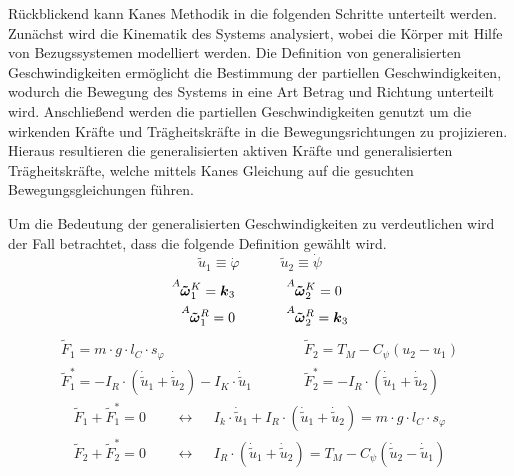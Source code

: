 Rückblickend kann Kanes Methodik in die folgenden Schritte unterteilt werden. Zunächst wird die Kinematik des Systems analysiert, wobei die Körper mit Hilfe von Bezugssystemen modelliert werden. Die Definition von generalisierten Geschwindigkeiten ermöglicht die Bestimmung der partiellen Geschwindigkeiten, wodurch die Bewegung des Systems in eine Art Betrag und Richtung unterteilt wird. Anschließend werden die partiellen Geschwindigkeiten genutzt um die wirkenden Kräfte und Trägheitskräfte in die Bewegungsrichtungen zu projizieren. Hieraus resultieren die generalisierten aktiven Kräfte und generalisierten Trägheitskräfte, welche mittels Kanes Gleichung auf die gesuchten Bewegungsgleichungen führen.

Um die Bedeutung der generalisierten Geschwindigkeiten zu verdeutlichen wird der Fall betrachtet, dass die folgende Definition gewählt wird.
\begin{equation}
\tilde{u}_1 \equiv \dot{\varphi} \hspace{35pt} \tilde{u}_2 \equiv \dot{\psi}
\end{equation}
\begin{equation}
\begin{split}
\vel{A}{\tilde{\omega}}{K}_1 = \bs{k}_3 &\hspace{35pt} \vel{A}{\tilde{\omega}}{K}_2 = 0
\\
\vel{A}{\tilde{\omega}}{R}_1 = 0 &\hspace{35pt} \vel{A}{\tilde{\omega}}{R}_2 = \bs{k}_3
\end{split}
\end{equation}
\begin{equation}
\begin{split}
\tilde{F}_1 = m\cdot g\cdot l_C\cdot s_{\varphi} &\hspace{35pt} \tilde{F}_2 = T_M - C_{\psi}(u_2-u_1) 
\\
\tilde{F}^*_1 = -I_R\cdot (\dot{\tilde{u}}_1 + \dot{\tilde{u}}_2) - I_K\cdot \dot{\tilde{u}}_1 &\hspace{35pt} \tilde{F}^*_2 = -I_R\cdot (\dot{\tilde{u}}_1 + \dot{\tilde{u}}_2)
\end{split}
\end{equation}
\begin{equation}
\begin{split}
\tilde{F}_1 + \tilde{F}^*_1 = 0 &\hspace{15pt}\leftrightarrow\hspace{15pt} I_k\cdot \dot{\tilde{u}}_1 + I_R\cdot (\dot{\tilde{u}}_1+\dot{\tilde{u}}_2) = m\cdot g\cdot l_C\cdot s_{\varphi} 
\\
\tilde{F}_2 + \tilde{F}^*_2 = 0 &\hspace{15pt}\leftrightarrow\hspace{15pt} I_R\cdot (\dot{\tilde{u}}_1+\dot{\tilde{u}}_2) = T_M - C_{\psi}(\dot{\tilde{u}}_2 - \dot{\tilde{u}}_1)
\end{split}
\end{equation}
